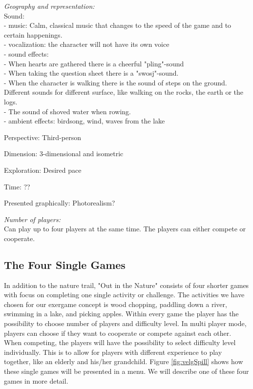 \emph{Geography and representation:}\\
Sound: \\
- music: Calm, classical music that changes to the speed of the game and to certain happenings. \\
- vocalization: the character will not have its own voice \\
- sound effects: \\
- When hearts are gathered there is a cheerful "pling"-sound \\
- When taking the question sheet there is a "swosj"-sound. \\
- When the character is walking there is the sound of steps on the ground. Different sounds for different surface, like walking on the rocks, the earth or the logs. \\
- The sound of shoved water when rowing. \\
- ambient effects: birdsong, wind, waves from the lake

Perspective: Third-person

Dimension: 3-dimensional and isometric

Exploration: Desired pace

Time: ??

Presented graphically: Photorealism?

\emph{Number of players:} \\
Can play up to four players at the same time. The players can either compete or cooperate. 


\subsection{The Four Single Games}
In addition to the nature trail, "Out in the Nature" consists of four shorter games with focus on completing one single activity or challenge. The activities we have chosen for our exergame concept is wood chopping, paddling down a river, swimming in a lake, and picking apples. Within every game the player has the possibility to choose number of players and difficulty level. In multi player mode, players can choose if they want to cooperate or compete against each other. When competing, the players will have the possibility to select difficulty level individually. This is to allow for players with different experience to play together, like an elderly and his/her grandchild. Figure \ref{fig:velgSpill} shows how these single games will be presented in a menu. We will describe one of these four games in more detail.

